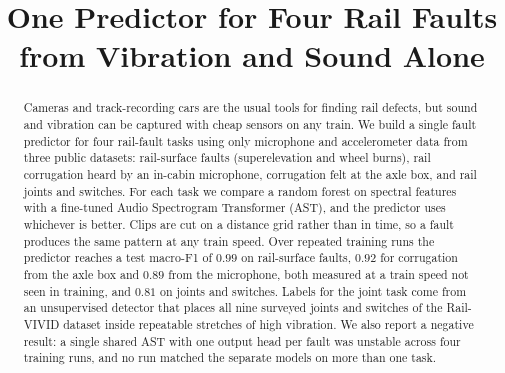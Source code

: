 \documentclass[conference]{IEEEtran}
\begin{document}
\title{One Predictor for Four Rail Faults from Vibration and Sound Alone}

\author{
\and
{}
\and
{}
}

\maketitle

\begin{abstract}
Cameras and track-recording cars are the usual tools for finding rail defects, but sound and
vibration can be captured with cheap sensors on any train. We build a single fault predictor
for four rail-fault tasks using only microphone and accelerometer data from three public
datasets: rail-surface faults (superelevation and wheel burns), rail corrugation heard by an
in-cabin microphone, corrugation felt at the axle box, and rail joints and switches. For each
task we compare a random forest on spectral features with a fine-tuned Audio Spectrogram
Transformer (AST), and the predictor uses whichever is better. Clips are cut on a distance
grid rather than in time, so a fault produces the same pattern at any train speed. Over
repeated training runs the predictor reaches a test macro-F1 of $0.99$ on rail-surface faults,
$0.92$ for corrugation from the axle box and $0.89$ from the microphone, both measured at a train
speed not seen in training, and $0.81$ on joints and switches. Labels for the joint task come
from an unsupervised detector that places all nine surveyed joints and switches of the
Rail-VIVID dataset inside repeatable stretches of high vibration. We also report a negative
result: a single shared AST with one output head per fault was unstable across four training
runs, and no run matched the separate models on more than one task.
\end{abstract}
\end{document}
